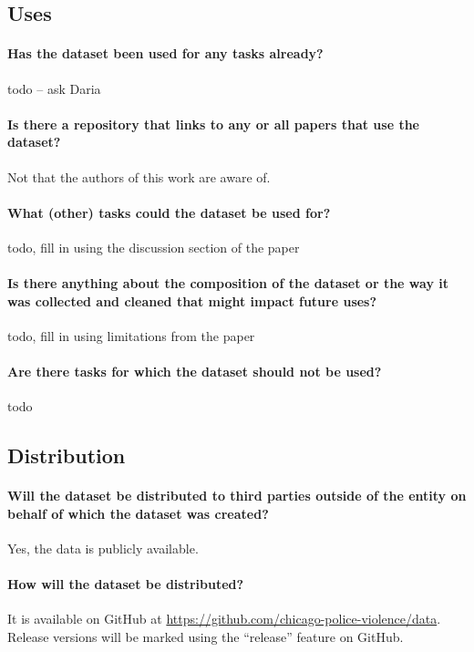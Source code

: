 \subsection{Uses}

\paragraph{Has the dataset been used for any tasks already?}
{\color{red} todo -- ask Daria}

\paragraph{Is there a repository that links to any or all papers that use the dataset?}
Not that the authors of this work are aware of.

\paragraph{What (other) tasks could the dataset be used for?}
{\color{red} todo, fill in using the discussion section of the paper}

\paragraph{Is there anything about the composition of the dataset or the way it was collected and cleaned that might impact future uses?}
{\color{red} todo, fill in using limitations from the paper}

\paragraph{Are there tasks for which the dataset should not be used?}
{\color{red} todo}

\subsection{Distribution}

\paragraph{Will the dataset be distributed to third parties outside of the entity on behalf of which the dataset was created?}
Yes, the data is publicly available.

\paragraph{How will the dataset be distributed?}
It is available on GitHub at \url{https://github.com/chicago-police-violence/data}.
Release versions will be marked using the ``release'' feature on GitHub.

